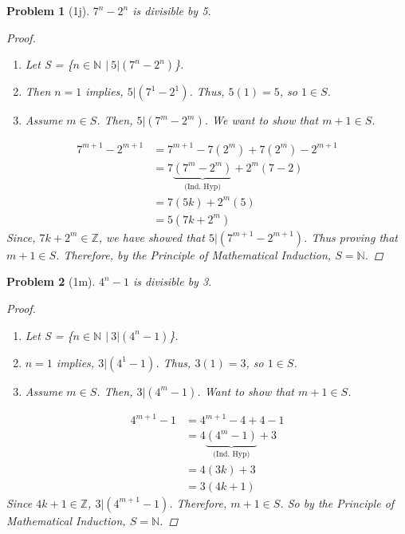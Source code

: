 \documentclass{article}
\theoremstyle{problem}
\newtheorem{prob}{Problem}
\theoremstyle{plain}
\begin{document}
  \begin{prob}[1j]
    $7^n - 2^n$ is divisible by 5.
    \begin{proof}\
      \begin{enumerate}
        \item Let S = \{$n \in \mathbb{N}$ $|\ 5 | (7^n - 2^n)$\}. 
        \item Then $n = 1$ implies, $5 | (7^1 - 2^1)$. Thus, $5(1) = 5$, so $1 \in S$. 
        \item Assume $m \in S$. Then, $5 | (7^m - 2^m)$. We want to show that $m + 1 \in S$.
        \end{enumerate}
        \begin{align*}
        7^{m+1} - 2^{m+1} &= 7^{m+1} -7(2^m) + 7(2^m) - 2^{m+1}\\
        &= 7\underbrace{(7^m - 2^m)}_{\text{(Ind. Hyp)}} + 2^m(7 - 2)\\
        &= 7(5k) + 2^m(5)\\
        &= 5(7k + 2^m)
      \end{align*}
      Since, $7k + 2^m \in \mathbb{Z}$, we have showed that $5 | (7^{m+1} - 2^{m+1})$. Thus proving that $m + 1 \in S$. Therefore, by the Principle of Mathematical Induction, $S = \mathbb{N}$.
    \end{proof}
  \end{prob}
 
  \begin{prob}[1m]
    $4^n - 1$ is divisible by 3.
    \begin{proof}\
      \begin{enumerate}
        \item Let S = \{$n \in \mathbb{N}$ $|\ 3 | (4^n - 1)$\}. 
        \item $n = 1$ implies, $3 | (4^1 - 1)$. Thus, $3(1) = 3$, so $1 \in S$. 
        \item Assume $m \in S$. Then, $3 | (4^m - 1)$. Want to show that $m + 1 \in S$.
        \end{enumerate}
        \begin{align*}
        4^{m+1} - 1 &= 4^{m+1} - 4 + 4 - 1\\
        &= 4\underbrace{(4^m - 1)}_{\text{(Ind. Hyp)}} + 3\\
        &= 4(3k) + 3\\
        &= 3(4k + 1)
      \end{align*}
      Since $4k + 1 \in \mathbb{Z}$, $3 | (4^{m+1} - 1)$. Therefore, $m+1 \in S$. So by the Principle of Mathematical Induction, $S = \mathbb{N}$.
    \end{proof}
  \end{prob}
\end{document}
